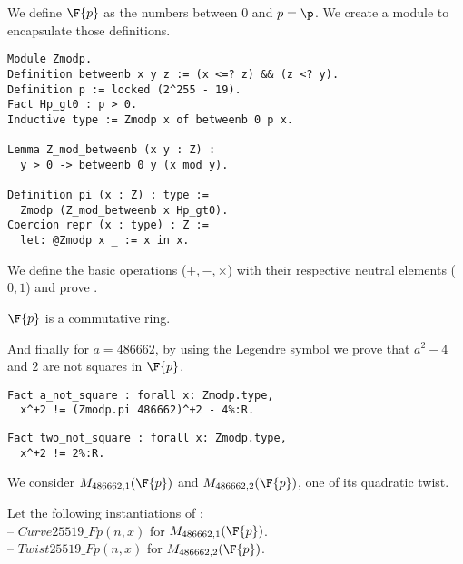 We define $\F{p}$ as the numbers between $0$ and $p = \p$.
We create a  module to encapsulate those definitions.
\begin{lstlisting}[language=Coq]
Module Zmodp.
Definition betweenb x y z := (x <=? z) && (z <? y).
Definition p := locked (2^255 - 19).
Fact Hp_gt0 : p > 0.
Inductive type := Zmodp x of betweenb 0 p x.

Lemma Z_mod_betweenb (x y : Z) :
  y > 0 -> betweenb 0 y (x mod y).

Definition pi (x : Z) : type :=
  Zmodp (Z_mod_betweenb x Hp_gt0).
Coercion repr (x : type) : Z :=
  let: @Zmodp x _ := x in x.
\end{lstlisting}

We define the basic operations ($+, -, \times$) with their respective neutral
elements ($0, 1$) and prove .
\begin{lemma}
  \label{lemma:Zmodp_ring}
  $\F{p}$ is a commutative ring.
\end{lemma}
And finally for $a = 486662$, by using the Legendre symbol we prove that
$a^2 - 4$ and $2$ are not squares in $\F{p}$.
\begin{lstlisting}[language=Coq]
Fact a_not_square : forall x: Zmodp.type,
  x^+2 != (Zmodp.pi 486662)^+2 - 4%:R.
\end{lstlisting}
\begin{lstlisting}[language=Coq,label=two_not_square]
Fact two_not_square : forall x: Zmodp.type,
  x^+2 != 2%:R.
\end{lstlisting}
We consider $M_{486662,1}(\F{p})$ and $M_{486662,2}(\F{p})$, one of its quadratic twist.
\begin{dfn}Let the following instantiations of :\\
-- $Curve25519\_Fp(n,x)$ for $M_{486662,1}(\F{p})$.\\
-- $Twist25519\_Fp(n,x)$ for $M_{486662,2}(\F{p})$.
\end{dfn}

